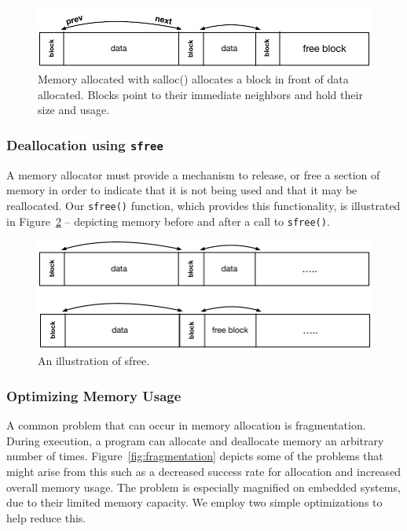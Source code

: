 \begin{figure}[!htb]
\includegraphics[scale=.55]{figs/stack.pdf}
\caption{Memory allocated with salloc() allocates a block in front of data allocated. Blocks point to their immediate neighbors and hold their size and usage.}

\label{fig:stack}
\end{figure}

\subsubsection{Deallocation using \texttt{sfree}}

A memory allocator must provide a mechanism to release, or free a section of memory in order to indicate that it is not being used and that it may be reallocated. Our \texttt{sfree()} function, which provides this functionality, is illustrated in Figure~\ref{fig:free} -- depicting memory before and after a call to \texttt{sfree()}. 

\begin{figure}[!htb]
\includegraphics[scale=.55]{figs/sfree.pdf}
\caption{An illustration of sfree.}
\label{fig:free}
\end{figure}

\subsubsection{Optimizing Memory Usage}

A common problem that can occur in memory allocation is fragmentation. During execution, a program can allocate and deallocate memory an arbitrary number of times. Figure~\ref{fig:fragmentation} depicts some of the problems that might arise from this such as a decreased success rate for allocation and increased overall memory usage. The problem is especially magnified on embedded systems, due to their limited memory capacity. We employ two simple optimizations to help reduce this.

